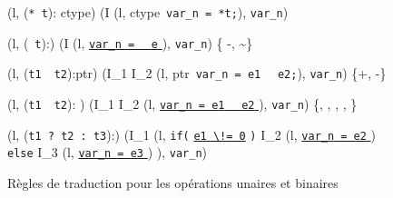 \begin{figure*}[h!]
  \scriptsize{
    {\myinference[$\tau$-lv]
      {}
      {(l, (\mbox{\lstinline'* t'}): ctype) 
        (I \concat (l, ctype~\mbox{\lstinline'var_n = *t;'}),
        \mbox{\lstinline'var_n'})}
    }

    { {(l, (~\mbox{\lstinline't'}):) 
        (I
        \concat (l, \underline{\Zinit \mbox{\lstinline'var_n ='}
          ~~\mbox{\lstinline'e'} \Zclear}
        \semicolon),
        \mbox{\lstinline'var_n'})
        \quad
         \in \{ -, \sim\}}
    }

    {
      {(l, (\mbox{\lstinline't1'}~~\mbox{\lstinline't2'}):ptr)
        (I_1 \concat I_2
        \concat (l, ptr~\mbox{\lstinline'var_n = e1'}~
        ~\mbox{\lstinline'e2;'}),
        \mbox{\lstinline'var_n'})
        \quad
         \in \{+, -\}}
    }

    {
      {(l, (\mbox{\lstinline't1'}~~\mbox{\lstinline't2'}):
        ) 
        (I_1 \concat I_2 \concat (l,
        \underline{\Zinit \mbox{\lstinline'var_n = e1'} \Zclear
          ~~\mbox{\lstinline'e2'} \Zclear}
        \semicolon
        ), \mbox{\lstinline'var_n'})
        \quad
         \in \{\mathtt{+}, \mathtt{-}, \mathtt{/}, \mathtt{\%},
        \mathtt{*} \}}
    }

    {
      {
        (l, (\mbox{\lstinline't1 ? t2 : t3'}):)
        (I_1
        \concat (l,
        \mbox{\lstinline'if('}
        \underline{\mbox{\lstinline'e1'}\Zclear \mbox{\lstinline' \!= 0'}}
        \mbox{\lstinline')'} \bopen
        I_2
        \concat
        (l, \underline{\Zinit \mbox{\lstinline'var_n = e2'} \Zclear}
        \semicolon )
        \bclose
        \mbox{\lstinline'else'} \bopen
        I_3
        \concat
        (l, \underline{\Zinit \mbox{\lstinline'var_n = e3'} \Zclear}
        \semicolon )
        \bclose ),
        \mbox{\lstinline'var_n'})
      }
    }
  }
  \caption{Règles de traduction pour les opérations unaires et binaires}
  \label{fig:op}
\end{figure*}
